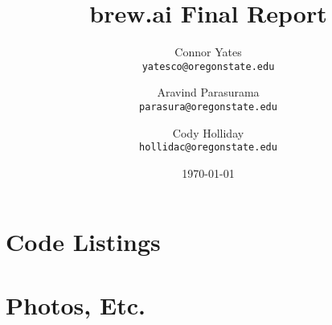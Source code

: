 \documentclass[draftclsnofoot,onecolumn,letterpaper,10pt]{IEEEtran}
\author{Connor Yates\\
\texttt{yatesco@oregonstate.edu\\}
\and
Aravind Parasurama\\
\texttt{parasura@oregonstate.edu\\}
\and
Cody Holliday\\
\texttt{hollidac@oregonstate.edu\\}}
\date{\today}
\title{brew.ai Final Report}
\begin{document}
\maketitle

\newpage
\tableofcontents
\newpage












\newpage



\appendix
\section{Code Listings}
\section{Photos, Etc.}
\end{document}
